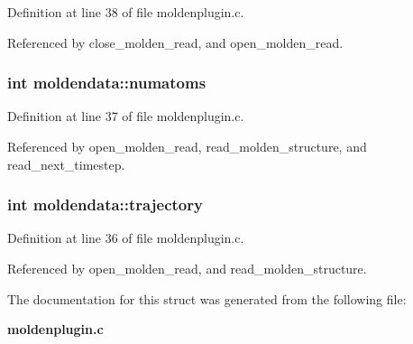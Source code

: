 Definition at line 38 of file moldenplugin.c.

Referenced by close\_\-molden\_\-read, and open\_\-molden\_\-read.
\subsubsection{\setlength{\rightskip}{0pt plus 5cm}int moldendata::numatoms}\label{structmoldendata_m2}




Definition at line 37 of file moldenplugin.c.

Referenced by open\_\-molden\_\-read, read\_\-molden\_\-structure, and read\_\-next\_\-timestep.
\subsubsection{\setlength{\rightskip}{0pt plus 5cm}int moldendata::trajectory}\label{structmoldendata_m1}




Definition at line 36 of file moldenplugin.c.

Referenced by open\_\-molden\_\-read, and read\_\-molden\_\-structure.

The documentation for this struct was generated from the following file:\begin{CompactItemize}
\item 
{\bf moldenplugin.c}\end{CompactItemize}
